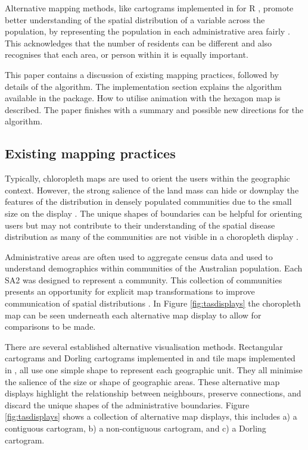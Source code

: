Alternative mapping methods, like cartograms implemented in
 \citep{cartogram} for R \citep{R}, promote better
understanding of the spatial distribution of a variable across the
population, by representing the population in each administrative area
fairly \citep{TAAM}. This acknowledges that the number of residents can
be different and also recognises that each area, or person within it is
equally important.

This paper contains a discussion of existing mapping practices, followed
by details of the algorithm. The implementation section explains the
algorithm available in the  package. How to utilise
animation with the hexagon map is described. The paper finishes with a
summary and possible new directions for the algorithm.

\hypertarget{existing-mapping-practices}{%
\subsection{Existing mapping
practices}\label{existing-mapping-practices}}

Typically, chloropleth maps are used to orient the users within the
geographic context. However, the strong salience of the land mass can
hide or downplay the features of the distribution in densely populated
communities due to the small size on the display \citep{ACTUC}. The
unique shapes of boundaries can be helpful for orienting users but may
not contribute to their understanding of the spatial disease
distribution as many of the communities are not visible in a choropleth
display \citep{TVSSS}.

Administrative areas are often used to aggregate census data and used to
understand demographics within communities of the Australian population.
Each SA2 \citep{abs2011} was designed to represent a community. This
collection of communities presents an opportunity for explicit map
transformations to improve communication of spatial distributions
\citep{CBATCC}. In Figure \ref{fig:tasdisplays} the choropleth map can
be seen underneath each alternative map display to allow for comparisons
to be made.

There are several established alternative visualisation methods.
Rectangular cartograms \citep{ORC} and Dorling cartograms \citep{ACTUC}
implemented in  and tile maps implemented in
 \citep{tilemaps}, all use one simple shape to
represent each geographic unit. They all minimise the salience of the
size or shape of geographic areas. These alternative map displays
highlight the relationship between neighbours, preserve connections, and
discard the unique shapes of the administrative boundaries. Figure
\ref{fig:tasdisplays} shows a collection of alternative map displays,
this includes a) a contiguous cartogram, b) a non-contiguous cartogram,
and c) a Dorling cartogram.


